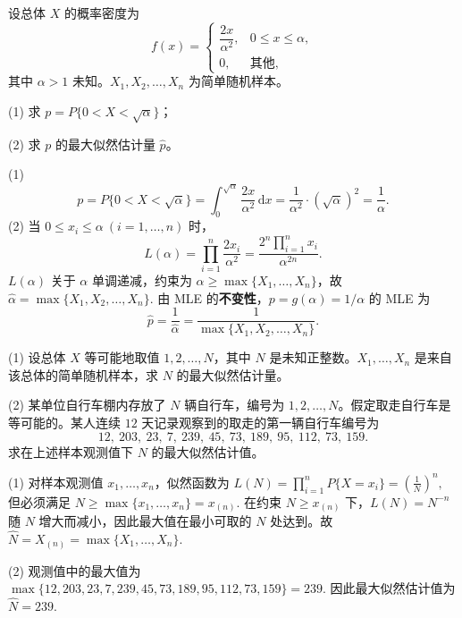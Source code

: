 \documentclass[lang=cn,11pt]{elegantbook}
\begin{document}
\begin{exercise}[最大似然估计的不变性] \label{ex:mle_04}
设总体 \(X\) 的概率密度为
\[
f(x)=
\begin{cases}
\dfrac{2x}{\alpha^2}, & 0\leq x\leq\alpha,\\
0, & \text{其他},
\end{cases}
\]
其中 \(\alpha>1\) 未知。\(X_1,X_2,\dots,X_n\) 为简单随机样本。\par
(1) 求 \(p=P\{0<X<\sqrt{\alpha}\}\)；\par
(2) 求 \(p\) 的最大似然估计量 \(\hat{p}\)。
\end{exercise}
\begin{solution}
(1)
\[
p=P\{0<X<\sqrt{\alpha}\}=\int_0^{\sqrt{\alpha}}\frac{2x}{\alpha^2}\,\mathrm{d}x=\frac{1}{\alpha^2}\cdot(\sqrt{\alpha})^2=\frac{1}{\alpha}.
\]
(2) 当 \(0\leq x_i\leq\alpha\ (i=1,\dots,n)\) 时，
\[
L(\alpha)=\prod_{i=1}^{n}\frac{2x_i}{\alpha^2}=\frac{2^n\prod_{i=1}^{n}x_i}{\alpha^{2n}}.
\]
\(L(\alpha)\) 关于 \(\alpha\) 单调递减，约束为 \(\alpha\geq\max\{X_1,\dots,X_n\}\)，故
\(
\hat{\alpha}=\max\{X_1,X_2,\dots,X_n\}.
\)
由 MLE 的\textbf{不变性}，\(p=g(\alpha)=1/\alpha\) 的 MLE 为
\[
\hat{p}=\frac{1}{\hat{\alpha}}=\frac{1}{\max\{X_1,X_2,\dots,X_n\}}.
\]
\end{solution}


\begin{exercise}\label{exer:src-2017-a-07}
(1) 设总体 \(X\) 等可能地取值 \(1,2,\dots,N\)，其中 \(N\) 是未知正整数。\(X_1,\dots,X_n\) 是来自该总体的简单随机样本，求 \(N\) 的最大似然估计量。\par
(2) 某单位自行车棚内存放了 \(N\) 辆自行车，编号为 \(1,2,\dots,N\)。假定取走自行车是等可能的。某人连续 \(12\) 天记录观察到的取走的第一辆自行车编号为
\[
12,\ 203,\ 23,\ 7,\ 239,\ 45,\ 73,\ 189,\ 95,\ 112,\ 73,\ 159.
\]
求在上述样本观测值下 \(N\) 的最大似然估计值。
\end{exercise}
\begin{solution}
(1) 对样本观测值 \(x_1,\dots,x_n\)，似然函数为
\(
L(N)=\prod_{i=1}^n P\{X=x_i\}
=\left(\frac1N\right)^n,
\)
但必须满足
\(
N\ge \max\{x_1,\dots,x_n\}=x_{(n)}.
\)
在约束 \(N\ge x_{(n)}\) 下，\(L(N)=N^{-n}\) 随 \(N\) 增大而减小，因此最大值在最小可取的 \(N\) 处达到。故
\(
\widehat N=X_{(n)}=\max\{X_1,\dots,X_n\}.
\)

(2) 观测值中的最大值为
\(
\max\{12,203,23,7,239,45,73,189,95,112,73,159\}=239.
\)
因此最大似然估计值为
\(
\widehat N=239.
\)
\end{solution}
\end{document}
